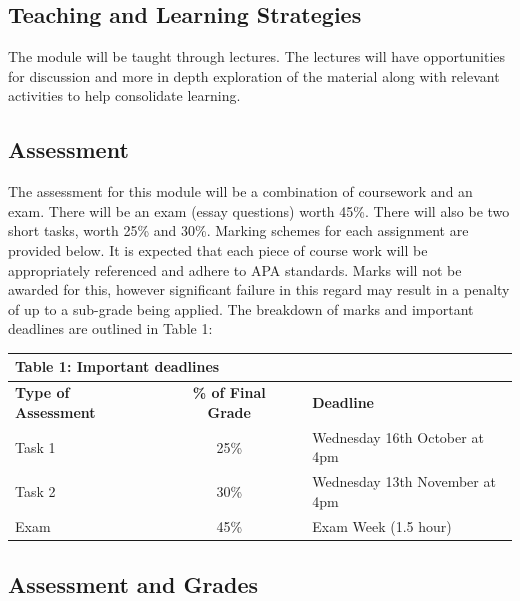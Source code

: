 \documentclass[
  x11names]{article}
\begin{document}
\subsection{Teaching and Learning
Strategies}\label{teaching-and-learning-strategies}

The module will be taught through lectures. The lectures will have
opportunities for discussion and more in depth exploration of the
material along with relevant activities to help consolidate learning.

\subsection{Assessment}\label{assessment}

The assessment for this module will be a combination of coursework and
an exam. There will be an exam (essay questions) worth 45\%. There will
also be two short tasks, worth 25\% and 30\%. Marking schemes for each
assignment are provided below. It is expected that each piece of course
work will be appropriately referenced and adhere to APA standards. Marks
will not be awarded for this, however significant failure in this regard
may result in a penalty of up to a sub-grade being applied. The
breakdown of marks and important deadlines are outlined in Table 1:

\bigskip

\begin{tabular}{l >{\centering\arraybackslash}m{.5cm} c >{\centering\arraybackslash}m{.5cm} l}
  \multicolumn{5}{l}{\textbf{Table 1:} Important deadlines} \\
  \hline \hline
  \textbf{Type of Assessment}               & & \textbf{\% of Final Grade} & & \textbf{Deadline} \\ \hline
  Task 1                                    & & 25\%                       & & Wednesday 16th October at 4pm \\ \hline
  Task 2                                    & & 30\%                       & & Wednesday 13th November at 4pm \\ \hline
  Exam                                     & & 45\%                       & & Exam Week (1.5 hour) \\ \hline \end{tabular}

\bigskip

\subsection{Assessment and Grades}\label{assessment-and-grades}
\end{document}
